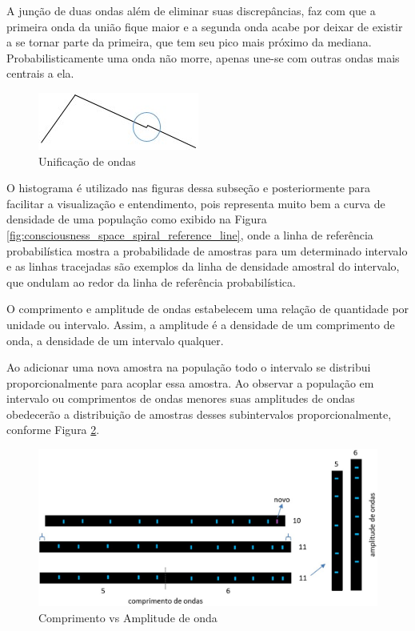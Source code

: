 A junção de duas ondas além de eliminar suas discrepâncias, faz com que a primeira onda da união fique maior e a segunda onda acabe por deixar de existir a se tornar parte da primeira, que tem seu pico mais próximo da mediana. Probabilisticamente uma onda não morre, apenas une-se com outras ondas mais centrais a ela.
	\begin{figure}[H]
	\caption{Unificação de ondas}
	\label{fig:consciousness_uniform_wave}
	\centering
	\includegraphics[scale=1]{sections/images/consciousness_uniform_wave.jpg}
	\end{figure}

O histograma é utilizado nas figuras dessa subseção e posteriormente para facilitar a visualização e entendimento, pois representa muito bem a curva de densidade de uma população como exibido na Figura \ref{fig:consciousness_space_spiral_reference_line}, onde a linha de referência probabilística mostra a probabilidade de amostras para um determinado intervalo e as linhas tracejadas são exemplos da linha de densidade amostral do intervalo, que ondulam ao redor da linha de referência probabilística.  

O comprimento e amplitude de ondas estabelecem uma relação de quantidade por unidade ou intervalo. Assim, a amplitude é a densidade de um comprimento de onda, a densidade de um intervalo qualquer. 

Ao adicionar uma nova amostra na população todo o intervalo se distribui proporcionalmente para acoplar essa amostra. Ao observar a população em intervalo ou comprimentos de ondas menores suas amplitudes de ondas obedecerão a distribuição de amostras desses subintervalos proporcionalmente, conforme Figura \ref{fig:consciousness_space_volume_amplitude}.
	\begin{figure}[H]
	\caption{Comprimento vs Amplitude de onda}
	\label{fig:consciousness_space_volume_amplitude}
	\centering
	\includegraphics[scale=.4]{sections/images/consciousness_space_volume_amplitude.jpg}
	\end{figure}

